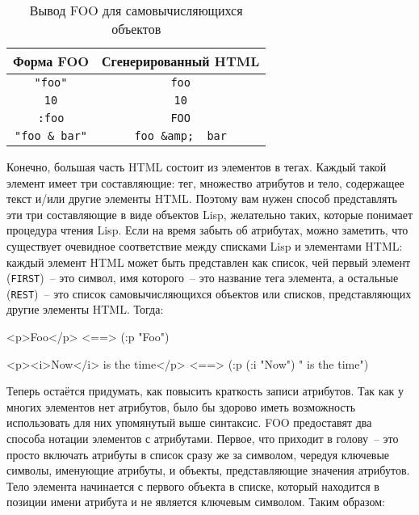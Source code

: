 \begin{table}[h]
\centering{}
\begin{tabular}{|c|c|}
\hline
  Форма FOO & Сгенерированный HTML \\
\hline
  \lstinline!"foo"! &\lstinline!foo! \\
  \lstinline!10! & \lstinline!10! \\
  \lstinline!:foo! & \lstinline!FOO! \\
  \lstinline!"foo & bar"! & \lstinline!foo &amp;  bar!\\
\hline
\end{tabular}
  \caption{Вывод FOO для самовычисляющихся объектов} 
  \label{table:30-1}
\end{table}

Конечно, большая часть HTML состоит из элементов в тегах. Каждый такой элемент имеет три
составляющие: тег, множество атрибутов и тело, содержащее текст и/или другие элементы
HTML. Поэтому вам нужен способ представлять эти три составляющие в виде объектов Lisp,
желательно таких, которые понимает процедура чтения Lisp. Если на время забыть об атрибутах, можно заметить, что существует
очевидное соответствие между списками Lisp и элементами HTML: каждый элемент HTML может
быть представлен как список, чей первый элемент (\lstinline{FIRST})~-- это символ, имя
которого~-- это название тега элемента, а остальные (\lstinline{REST})~-- это список
самовычисляющихся объектов или списков, представляющих другие элементы HTML. Тог\-да:

\begin{myverb}
<p>Foo</p> <==> (:p "Foo")

<p><i>Now</i> is the time</p> <==> (:p (:i "Now") " is the time")
\end{myverb}

Теперь остаётся придумать, как повысить краткость записи атрибутов. Так как у многих
элементов нет атрибутов, было бы здорово иметь возможность использовать для них упомянутый
выше синтаксис. FOO предоставят два способа нотации элементов с атрибутами. Первое, что
приходит в голову~-- это просто включать атрибуты в список сразу же за символом, чередуя
ключевые символы, именующие атрибуты, и объекты, представляющие значения атрибутов. Тело
элемента начинается с первого объекта в списке, который находится в позиции имени атрибута
и не является ключевым символом. Таким образом:

